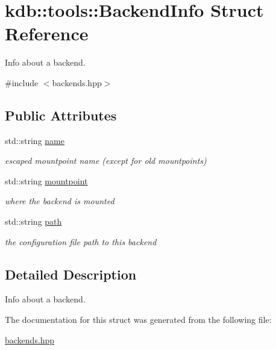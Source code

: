 \hypertarget{structkdb_1_1tools_1_1BackendInfo}{}\section{kdb\+:\+:tools\+:\+:Backend\+Info Struct Reference}
\label{structkdb_1_1tools_1_1BackendInfo}


Info about a backend.  




{\ttfamily \#include $<$backends.\+hpp$>$}

\subsection*{Public Attributes}
\begin{DoxyCompactItemize}
\item 
\mbox{\label{structkdb_1_1tools_1_1BackendInfo_a7da85fc3a4bbb7412b0544aceeb9da75}} 
std\+::string \hyperlink{structkdb_1_1tools_1_1BackendInfo_a7da85fc3a4bbb7412b0544aceeb9da75}{name}
\begin{DoxyCompactList}\small\item\em escaped mountpoint name (except for old mountpoints) \end{DoxyCompactList}\item 
\mbox{\label{structkdb_1_1tools_1_1BackendInfo_a043c4414dc2b41bab37efb3c878f6cb8}} 
std\+::string \hyperlink{structkdb_1_1tools_1_1BackendInfo_a043c4414dc2b41bab37efb3c878f6cb8}{mountpoint}
\begin{DoxyCompactList}\small\item\em where the backend is mounted \end{DoxyCompactList}\item 
\mbox{\label{structkdb_1_1tools_1_1BackendInfo_ac1d9984e01a78dba8e01dca0b91cbf30}} 
std\+::string \hyperlink{structkdb_1_1tools_1_1BackendInfo_ac1d9984e01a78dba8e01dca0b91cbf30}{path}
\begin{DoxyCompactList}\small\item\em the configuration file path to this backend \end{DoxyCompactList}\end{DoxyCompactItemize}


\subsection{Detailed Description}
Info about a backend. 

The documentation for this struct was generated from the following file\+:\begin{DoxyCompactItemize}
\item 
\hyperlink{backends_8hpp}{backends.\+hpp}\end{DoxyCompactItemize}
